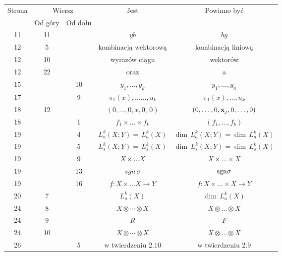 \documentclass[a4paper,11pt]{article}
\begin{document}
\begin{center}

  \begin{tabular}{|c|c|c|c|c|}
    \hline
    Strona & \multicolumn{2}{c|}{Wiersz} & Jest
                              & Powinno być \\ \cline{2-3}
    & Od góry & Od dołu & & \\
    \hline
    11  & 11 & & $y b$ & $b y$ \\
    12  & \hphantom{0}5 & & kombinacją wektorową &  kombinacją liniową \\
    12  & 10 & & wyrazów ciągu & wektorów \\
    12  & 22 & & oraz & a \\
    15  & & 10 & $y_{ 1 }, \ldots , y_{ k }$ & $y_{ 1 }, \ldots , y_{ n }$ \\
    17  & & \hphantom{0}9 & $\pi_{ 1 }( x ), \ldots\ldots, u_{ k }$
           & $\pi_{ 1 }( x ), \ldots, u_{ k }$ \\
    18  & 12 & & $( 0, \ldots, 0, x, 0, \, 0 )$
           & $( 0, \ldots, 0, \mathbf{x}_{ j }, 0, \ldots, 0 )$ \\
    18  & & \hphantom{0}1 & $f_{ 1 } \times \ldots \times f_{ k }$
    & $( f_{ 1 }, \ldots, f_{ k } )$ \\
    19  & & \hphantom{0}4 & $L^{ k }_{ a } ( X; Y ) = \, L^{ k }_{ a } ( X )$
    & $\dim \, L^{ k }_{ a } ( X; Y ) = \dim \, L^{ k }_{ a } ( X )$ \\
    19  & & \hphantom{0}5 & $L^{ k }_{ s } ( X; Y ) = \, L^{ k }_{ s } ( X )$
    & $\dim \, L^{ k }_{ s } ( X; Y ) = \dim \, L^{ k }_{ s } ( X )$ \\
    19  & & \hphantom{0}9 & $X \times \ldots X$ & $X \times \ldots \times X$ \\
    19  & & 13 & $sgn\, \sigma$ & $\textrm{sgn} \sigma$ \\
    19  & & 16 & $f : X \times \ldots X \to Y$ & $f : X \times \ldots \times X \to Y$ \\
    20  & \hphantom{0}7 & & $L_{ a }^{ k }( X )$
    & $\dim \, L_{ a }^{ k }( X )$ \\
    24  & \hphantom{0}8 & & $X \otimes \cdots \otimes X$ & $X \otimes \ldots \otimes X$ \\
    24  & \hphantom{0}9 & & $R$ & $F$ \\
    24  & 10 & & $X \otimes \cdots \otimes X$ & $X \otimes \ldots \otimes X$ \\
    26  & &  5 & w twierdzeniu 2.10 & w twierdzeniu 2.9 \\

\end{tabular}
\end{center}
\end{document}

